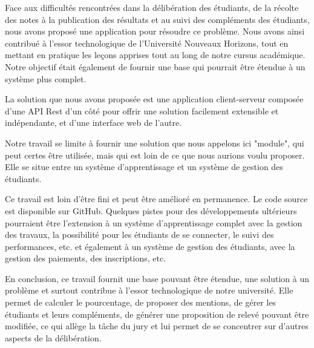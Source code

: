 Face aux difficultés rencontrées dans la délibération des étudiants, de la récolte des notes à la publication des résultats et au suivi des compléments des étudiants, nous avons proposé une application pour résoudre ce problème. Nous avons ainsi contribué à l'essor technologique de l'Université Nouveaux Horizons, tout en mettant en pratique les leçons apprises tout au long de notre cursus académique. Notre objectif était également de fournir une base qui pourrait être étendue à un système plus complet.

La solution que nous avons proposée est une application client-serveur composée d'une API Rest d'un côté pour offrir une solution facilement extensible et indépendante, et d'une interface web de l'autre.

Notre travail se limite à fournir une solution que nous appelons ici "module", qui peut certes être utilisée, mais qui est loin de ce que nous aurions voulu proposer. Elle se situe entre un système d'apprentissage et un système de gestion des étudiants.

Ce travail est loin d'être fini et peut être amélioré en permanence. Le code source est disponible sur GitHub. Quelques pistes pour des développements ultérieurs pourraient être l'extension à un système d'apprentissage complet avec la gestion des travaux, la possibilité pour les étudiants de se connecter, le suivi des performances, etc. et également à un système de gestion des étudiants, avec la gestion des paiements, des inscriptions, etc.

En conclusion, ce travail fournit une base pouvant être étendue, une solution à un problème et surtout contribue à l'essor technologique de notre université. Elle permet de calculer le pourcentage, de proposer des mentions, de gérer les étudiants et leurs compléments, de générer une proposition de relevé pouvant être modifiée, ce qui allège la tâche du jury et lui permet de se concentrer sur d'autres aspects de la délibération.
